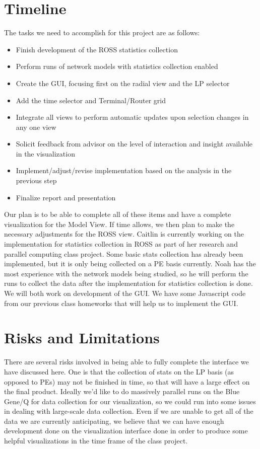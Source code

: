 \documentclass{acm_proc_article-sp}
\begin{document}
\section{Timeline}
The tasks we need to accomplish for this project are as follows:
\begin{itemize}
\item Finish development of the ROSS statistics collection
\item Perform runs of network models with statistics collection enabled
\item Create the GUI, focusing first on the radial view and the LP selector
\item Add the time selector and Terminal/Router grid
\item Integrate all views to perform automatic updates upon selection changes in any one view
\item Solicit feedback from advisor on the level of interaction and insight available in the visualization
\item Implement/adjust/revise implementation based on the analysis in the previous step
\item Finalize report and presentation
\end{itemize}

Our plan is to be able to complete all of these items and have a complete visualization for the Model View.  If time allows, we then plan to make the necessary adjustments for the ROSS view.  Caitlin is currently working on the implementation for statistics collection in ROSS as part of her research and parallel computing class project.  Some basic stats collection has already been implemented, but it is only being collected on a PE basis currently.  Noah has the most experience with the network models being studied, so he will perform the runs to collect the data after the implementation for statistics collection is done.  We will both work on development of the GUI.  We have some Javascript code from our previous class homeworks that will help us to implement the GUI.  

\section{Risks and Limitations}
There are several risks involved in being able to fully complete the interface we have discussed here.  One is that the collection of stats on the LP basis (as opposed to PEs) may not be finished in time, so that will have a large effect on the final product.  Ideally we'd like to do massively parallel runs on the Blue Gene/Q for data collection for our visualization, so we could run into some issues in dealing with large-scale data collection.  Even if we are unable to get all of the data we are currently anticipating, we believe that we can have enough development done on the visualization interface done in order to produce some helpful visualizations in the time frame of the class project.
\end{document}
